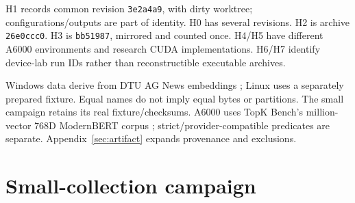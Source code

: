 \documentclass[10pt]{article}
\begin{document}
H1 records common revision \texttt{3e2a4a9}, with dirty worktree; configurations/outputs are part of identity. H0 has several revisions. H2 is archive \texttt{26e0ccc0}. H3 is \texttt{bb51987}, mirrored and counted once. H4/H5 have different A6000 environments and research CUDA implementations. H6/H7 identify device-lab run IDs rather than reconstructible executable archives.

Windows data derive from DTU AG News embeddings \citep{nielsen2022agnews}; Linux uses a separately prepared fixture. Equal names do not imply equal bytes or partitions. The small campaign retains its real fixture/checksums. A6000 uses TopK Bench's million-vector 768D ModernBERT corpus \citep{topkbench}; strict/provider-compatible predicates are separate. Appendix~\ref{sec:artifact} expands provenance and exclusions.
\section{Small-collection campaign}
\end{document}
